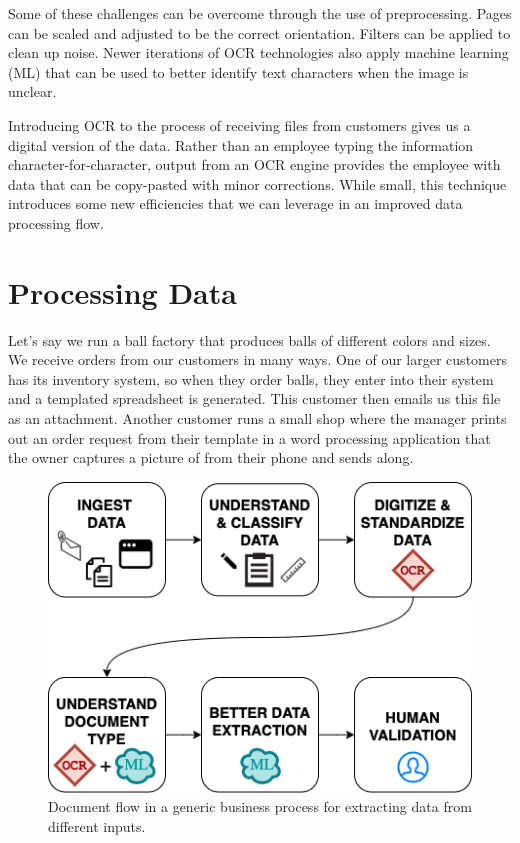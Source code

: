 \documentclass[conference, draftcls]{IEEEtran}
\begin{document}
Some of these challenges can be overcome through the use of preprocessing. Pages can be scaled and adjusted to be the correct orientation. Filters can be applied to clean up noise. Newer iterations of OCR technologies also apply machine learning (ML) that can be used to better identify text characters when the image is unclear.

Introducing OCR to the process of receiving files from customers gives us a digital version of the data. Rather than an employee typing the information character-for-character, output from an OCR engine provides the employee with data that can be copy-pasted with minor corrections. While small, this technique introduces some new efficiencies that we can leverage in an improved data processing flow.

\section{Processing Data} \label{sectionProcessingData}

Let's say we run a ball factory that produces balls of different colors and sizes. We receive orders from our customers in many ways. One of our larger customers has its inventory system, so when they order balls, they enter into their system and a templated spreadsheet is generated. This customer then emails us this file as an attachment. Another customer runs a small shop where the manager prints out an order request from their template in a word processing application that the owner captures a picture of from their phone and sends along.

\begin{figure}[ht]
\centerline{\includegraphics[width=\columnwidth]{HighLevelFlow.png}}
\caption{Document flow in a generic business process for extracting data from different inputs.}
\label{figHighLevelFlow}
\end{figure}
\end{document}
